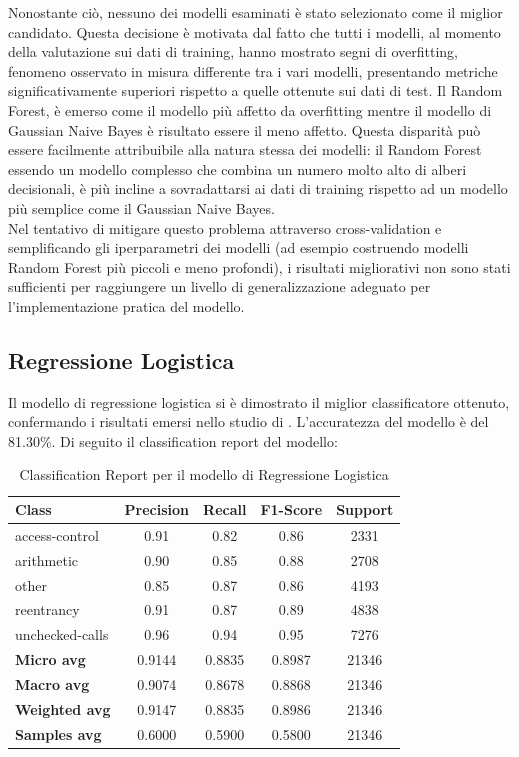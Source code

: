 \documentclass[../../Thesis.tex]{subfiles}
\begin{document}
Nonostante ciò, nessuno dei modelli esaminati è stato selezionato come il miglior candidato. Questa decisione è motivata dal fatto che tutti i modelli, al momento della valutazione sui dati di training, hanno mostrato segni di overfitting, fenomeno osservato in misura differente tra i vari modelli,  presentando metriche significativamente superiori rispetto a quelle ottenute sui dati di test. Il Random Forest, è emerso come il modello più affetto da overfitting mentre il modello di Gaussian Naive Bayes è risultato essere il meno affetto. Questa disparità può essere facilmente attribuibile alla natura stessa dei modelli: il Random Forest essendo un modello complesso che combina un numero molto alto di alberi decisionali, è più incline a sovradattarsi ai dati di training rispetto ad un modello più semplice come il Gaussian Naive Bayes.\\

Nel tentativo di mitigare questo problema attraverso cross-validation e semplificando gli iperparametri dei modelli (ad esempio costruendo modelli Random Forest più piccoli e meno profondi), i risultati migliorativi non sono stati sufficienti per raggiungere un livello di generalizzazione adeguato per l'implementazione pratica del modello.

\subsection{Regressione Logistica}
Il modello di regressione logistica si è dimostrato il miglior classificatore ottenuto, confermando i risultati emersi nello studio di \cite{Deng}. L'accuratezza del modello è del 81.30\%. Di seguito il classification report del modello:

\begin{table}[H]
    \centering
    \small
    \begin{tabular}{lcccc}
    \hline
    \textbf{Class} & \textbf{Precision} & \textbf{Recall} & \textbf{F1-Score} & \textbf{Support} \\
    \hline
    access-control & 0.91 & 0.82 & 0.86 & 2331 \\
    arithmetic & 0.90 & 0.85 & 0.88 & 2708 \\
    other & 0.85 & 0.87 & 0.86 & 4193 \\
    reentrancy & 0.91 & 0.87 & 0.89 & 4838 \\
    unchecked-calls & 0.96 & 0.94 & 0.95 & 7276 \\
    \hline
    \textbf{Micro avg} & 0.9144 & 0.8835 & 0.8987 & 21346 \\
    \textbf{Macro avg} & 0.9074 & 0.8678 & 0.8868 & 21346 \\
    \textbf{Weighted avg} & 0.9147 & 0.8835 & 0.8986 & 21346 \\
    \textbf{Samples avg} & 0.6000 & 0.5900 & 0.5800 & 21346 \\
    \hline
    \end{tabular}
    \caption{Classification Report per il modello di Regressione Logistica}
\end{table}
\end{document}
